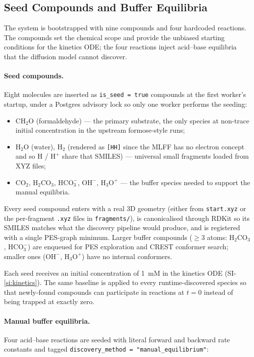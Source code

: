 \subsection{Seed Compounds and Buffer Equilibria}
\label{si:seed}

The system is bootstrapped with nine compounds and four hardcoded reactions. The compounds set the chemical scope and provide the unbiased starting conditions for the kinetics ODE; the four reactions inject acid--base equilibria that the diffusion model cannot discover.

\paragraph{Seed compounds.}
Eight molecules are inserted as \texttt{is\_seed = true} compounds at the first worker's startup, under a Postgres advisory lock so only one worker performs the seeding:
\begin{itemize}
    \item $\mathrm{CH_2O}$ (formaldehyde) --- the primary substrate, the only species at non-trace initial concentration in the upstream formose-style runs;
    \item $\mathrm{H_2O}$ (water), $\mathrm{H_2}$ (rendered as \texttt{[HH]} since the MLFF has no electron concept and so $\mathrm{H}$ / $\mathrm{H^+}$ share that SMILES) --- universal small fragments loaded from XYZ files;
    \item $\mathrm{CO_2}$, $\mathrm{H_2CO_3}$, $\mathrm{HCO_3^-}$, $\mathrm{OH^-}$, $\mathrm{H_3O^+}$ --- the buffer species needed to support the manual equilibria.
\end{itemize}
Every seed compound enters with a real 3D geometry (either from \texttt{start.xyz} or the per-fragment \texttt{.xyz} files in \texttt{fragments/}), is canonicalised through RDKit so its SMILES matches what the discovery pipeline would produce, and is registered with a single PES-graph minimum. Larger buffer compounds ($\geq 3$ atoms: $\mathrm{H_2CO_3}$, $\mathrm{HCO_3^-}$) are enqueued for PES exploration and CREST conformer search; smaller ones ($\mathrm{OH^-}$, $\mathrm{H_3O^+}$) have no internal conformers.

Each seed receives an initial concentration of \SI{1}{mM} in the kinetics ODE (SI-\ref{si:kinetics}). The same baseline is applied to every runtime-discovered species so that newly-found compounds can participate in reactions at $t = 0$ instead of being trapped at exactly zero.

\paragraph{Manual buffer equilibria.}
Four acid--base reactions are seeded with literal forward and backward rate constants and tagged \texttt{discovery\_method = "manual\_equilibrium"}:

